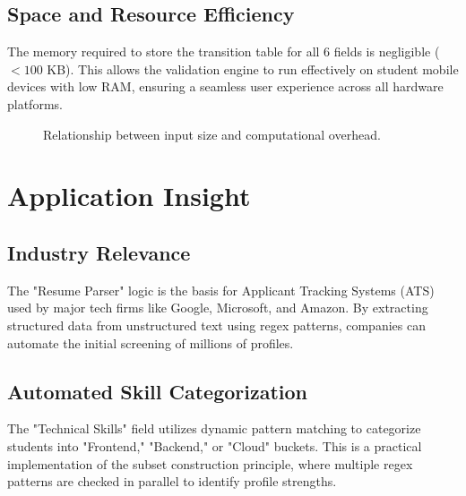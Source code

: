 \documentclass[12pt,a4paper]{article}
\begin{document}
\subsection{Space and Resource Efficiency}
The memory required to store the transition table for all 6 fields is negligible ($< 100$ KB). This allows the validation engine to run effectively on student mobile devices with low RAM, ensuring a seamless user experience across all hardware platforms.

\begin{figure}[H]
\centering
{}
\caption{Relationship between input size and computational overhead.}
\end{figure}

\newpage

\section{Application Insight}

\subsection{Industry Relevance}
The "Resume Parser" logic is the basis for Applicant Tracking Systems (ATS) used by major tech firms like Google, Microsoft, and Amazon. By extracting structured data from unstructured text using regex patterns, companies can automate the initial screening of millions of profiles.

\subsection{Automated Skill Categorization}
The "Technical Skills" field utilizes dynamic pattern matching to categorize students into "Frontend," "Backend," or "Cloud" buckets. This is a practical implementation of the subset construction principle, where multiple regex patterns are checked in parallel to identify profile strengths.
\end{document}
